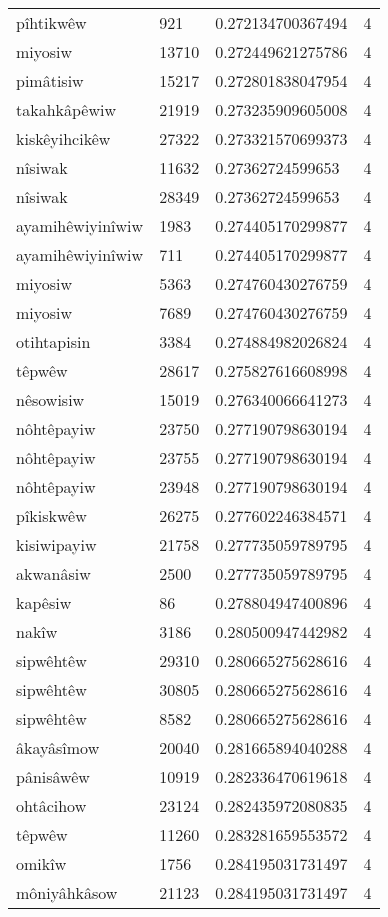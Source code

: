 \begin{longtable}{llll}
pîhtikwêw & 921 & 0.272134700367494 & 4 \\
miyosiw & 13710 & 0.272449621275786 & 4 \\
pimâtisiw & 15217 & 0.272801838047954 & 4 \\
takahkâpêwiw & 21919 & 0.273235909605008 & 4 \\
kiskêyihcikêw & 27322 & 0.273321570699373 & 4 \\
nîsiwak & 11632 & 0.27362724599653 & 4 \\
nîsiwak & 28349 & 0.27362724599653 & 4 \\
ayamihêwiyinîwiw & 1983 & 0.274405170299877 & 4 \\
ayamihêwiyinîwiw & 711 & 0.274405170299877 & 4 \\
miyosiw & 5363 & 0.274760430276759 & 4 \\
miyosiw & 7689 & 0.274760430276759 & 4 \\
otihtapisin & 3384 & 0.274884982026824 & 4 \\
têpwêw & 28617 & 0.275827616608998 & 4 \\
nêsowisiw & 15019 & 0.276340066641273 & 4 \\
nôhtêpayiw & 23750 & 0.277190798630194 & 4 \\
nôhtêpayiw & 23755 & 0.277190798630194 & 4 \\
nôhtêpayiw & 23948 & 0.277190798630194 & 4 \\
pîkiskwêw & 26275 & 0.277602246384571 & 4 \\
kisiwipayiw & 21758 & 0.277735059789795 & 4 \\
akwanâsiw & 2500 & 0.277735059789795 & 4 \\
kapêsiw & 86 & 0.278804947400896 & 4 \\
nakîw & 3186 & 0.280500947442982 & 4 \\
sipwêhtêw & 29310 & 0.280665275628616 & 4 \\
sipwêhtêw & 30805 & 0.280665275628616 & 4 \\
sipwêhtêw & 8582 & 0.280665275628616 & 4 \\
âkayâsîmow & 20040 & 0.281665894040288 & 4 \\
pânisâwêw & 10919 & 0.282336470619618 & 4 \\
ohtâcihow & 23124 & 0.282435972080835 & 4 \\
têpwêw & 11260 & 0.283281659553572 & 4 \\
omikîw & 1756 & 0.284195031731497 & 4 \\
môniyâhkâsow & 21123 & 0.284195031731497 & 4 \\

\end{longtable}

